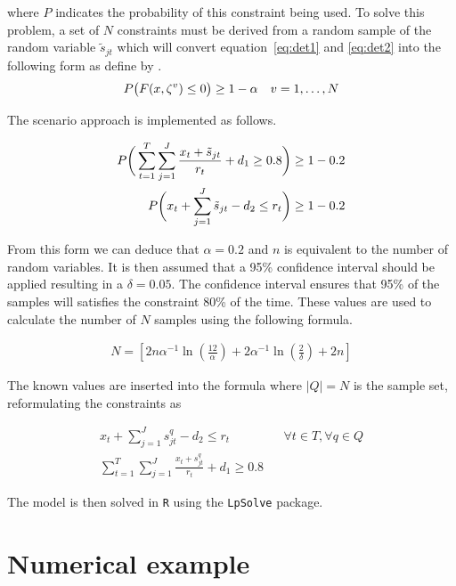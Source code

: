 \documentclass[a4paper,11pt]{article}
\begin{document}
where $P$ indicates the probability of this constraint being used. To solve this problem, a set of $N$ constraints must be derived from a random sample of the random variable $\tilde{s}_{jt}$ which will convert equation~\ref{eq:det1} and \ref{eq:det2} into the following form as define by \cite{nemirovski2006scenario}.
\begin{align}
	P\big{(}F(x,\zeta^v)\leq 0 \big{)} \geq 1 - \alpha && v=1,\dots,N
\end{align}

The scenario approach is implemented as follows.

\begin{align}
	P\bigg{(}\sum_{t=1}^T\sum_{j=1}^J \frac{x_{t}+\tilde{s}_{jt}}{r_t} +d_1 \geq 0.8\bigg{)} \geq  1-0.2   \\ 
	P\bigg{(} x_{t} + \sum_{j=1}^J \tilde{s}_{jt} -d_2\leq r_t\bigg{)}\geq  1-0.2
	\label{q1b11}
\end{align}

From this form we can deduce that $\alpha = 0.2$ and $n$ is equivalent to the number of random variables. It is then assumed that a 95\% confidence interval should be applied resulting in a $\delta = 0.05$. The confidence interval ensures that 95\% of the samples will satisfies the constraint 80\% of the time. These values are used to calculate the number of $N$ samples  using the following formula.

\begin{align}
	N=[ 2n\alpha^{-1}\ln(\frac{12}{\alpha}) + 2\alpha^{-1}\ln(\frac{2}{\delta})+2n]
	\label{q1eqN}
\end{align}

The known values are inserted into the formula where $|Q| = N$ is the sample set, reformulating the constraints as 

\begin{align}
 x_{t} + \sum_{j=1}^J s_{jt}^{q} -d_2\leq r_t && \forall t \in T,\forall q\in Q \\
\sum_{t=1}^T\sum_{j=1}^J \frac{x_{t}+s^q_{jt}}{r_t} +d_1 \geq 0.8  
\end{align}



The model is then solved in \texttt{R} using the \texttt{LpSolve} package.


\section{Numerical example}
\end{document}
